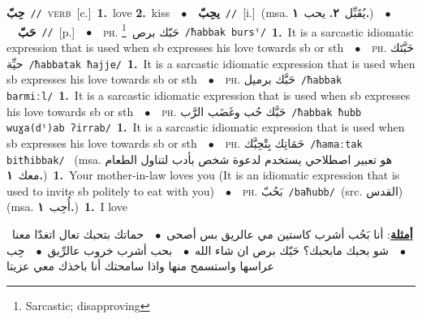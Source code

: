 \documentclass[10pt,a4paper,twoside]{article} %
\begin{document}
\begin{multicols}{2}
{\setlength\topsep{0pt}\textbf{\foreignlanguage{arabic}{حِبّ}}\ {\color{gray}\texttt{//}\color{black}}\ \textsc{verb}\ [c.]\ \textbf{1.}~love  \textbf{2.}~kiss\ \ $\bullet$\ \ \setlength\topsep{0pt}\textbf{\foreignlanguage{arabic}{يحِبّ}}\ {\color{gray}\texttt{//}\color{black}}\ [i.]\ \color{gray}(msa. \foreignlanguage{arabic}{يُقَبِّل}~\foreignlanguage{arabic}{\textbf{٢.}}  \foreignlanguage{arabic}{يحب}~\foreignlanguage{arabic}{\textbf{١.}})\color{black}\ \ $\bullet$\ \ \setlength\topsep{0pt}\textbf{\foreignlanguage{arabic}{حَبّ}}\ {\color{gray}\texttt{//}\color{black}}\ [p.]\ \ $\bullet$\ \ \textsc{ph.} \color{gray} \foreignlanguage{arabic}{حَبّك برص}\color{black}\ \footnote{Sarcastic; disapproving}\ {\color{gray}\texttt{/{\sffamily ħabbak bursˤ}/}\color{black}}\ \textbf{1.}~It is a sarcastic idiomatic expression that is used when sb expresses his love towards sb or sth\ \ $\bullet$\ \ \textsc{ph.} \color{gray} \foreignlanguage{arabic}{حَبَّتَك حيِّة}\color{black}\ {\color{gray}\texttt{/{\sffamily ħabbatak ħajje}/}\color{black}}\ \textbf{1.}~It is a sarcastic idiomatic expression that is used when sb expresses his love towards sb or sth\ \ $\bullet$\ \ \textsc{ph.} \color{gray} \foreignlanguage{arabic}{حَبَّك برميل}\color{black}\ {\color{gray}\texttt{/{\sffamily ħabbak barmiːl}/}\color{black}}\ \textbf{1.}~It is a sarcastic idiomatic expression that is used when sb expresses his love towards sb or sth\ \ $\bullet$\ \ \textsc{ph.} \color{gray} \foreignlanguage{arabic}{حَبَّك حُب وغَضَب الرَّب}\color{black}\ {\color{gray}\texttt{/{\sffamily ħabbak ħubb wuɣa(dˤ)ab ʔirrab}/}\color{black}}\ \textbf{1.}~It is a sarcastic idiomatic expression that is used when sb expresses his love towards sb or sth\ \ $\bullet$\ \ \textsc{ph.} \color{gray} \foreignlanguage{arabic}{حَمَاتِك بِتْحِبَّك}\color{black}\ {\color{gray}\texttt{/{\sffamily ħamaːtak bitħibbak}/}\color{black}}\ \color{gray} (msa. \foreignlanguage{arabic}{هو تعبير اصطلاحي يستخدم لدعوة شخص بأدب لتناول الطعام معك}~\foreignlanguage{arabic}{\textbf{١.}})\color{black}\ \textbf{1.}~Your mother-in-law loves you (It is an idiomatic expression that is used to invite sb politely to eat with you)\ \ $\bullet$\ \ \textsc{ph.} \color{gray} \foreignlanguage{arabic}{بَحُبّ}\color{black}\ {\color{gray}\texttt{/{\sffamily baħubb}/}\color{black}}\ \color{gray}(src. \foreignlanguage{arabic}{القدس})\color{black}\ \color{gray} (msa. \foreignlanguage{arabic}{أُحِب}~\foreignlanguage{arabic}{\textbf{١.}})\color{black}\ \textbf{1.}~I love\  \begin{flushright}\color{gray}\foreignlanguage{arabic}{\textbf{\underline{\foreignlanguage{arabic}{أمثلة}}}: أنا بَحُب أشرب كاستين مي عالريق بس أصحى\ $\bullet$\ \  حماتك بتحبك تعال اتغدّا معنا\ $\bullet$\ \  شو بحبك مابحبك؟ حَبّك برص ان شاء الله\ $\bullet$\ \  بحب أشرب خروب عالرِّيق\ $\bullet$\ \  حِب عراسها واستسمح منها واذا سامحتك أنا باخذك معي عزيتا}\end{flushright}\color{black}} \vspace{2mm}


\end{multicols}
\end{document}
